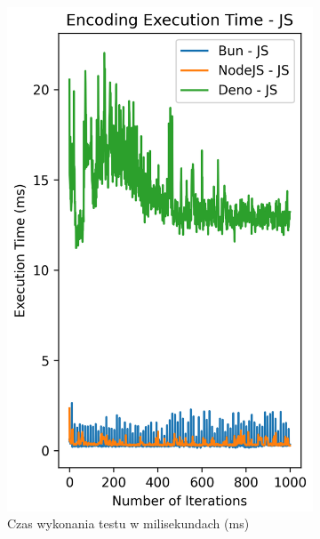 \begin{figure}[H]
  \centering
  \begin{subfigure}[b]{0.4\textwidth}
    \centering
    \includegraphics[width=\textwidth]{Figures/coding/base64_1000_encoding_js_time.png}
    \caption{Czas wykonania testu w milisekundach (ms)}
    \label{fig:encoding_e2_js_time}
  \end{subfigure}
  \begin{subfigure}[b]{0.4\textwidth}
    \centering

\end{subfigure}
\end{figure}

